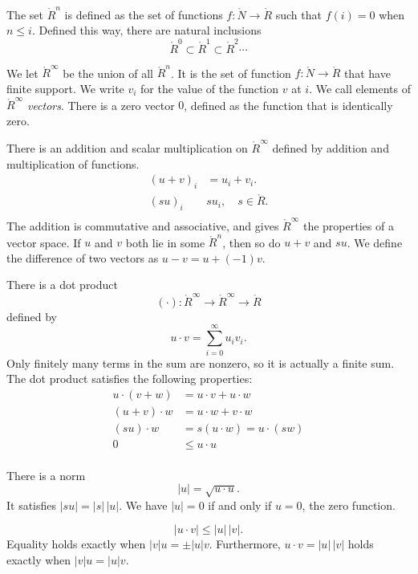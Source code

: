 The set $\ring{R}^n$ is defined as the set of functions
$f:\ring{N}\to\ring{R}$ such that $f(i) = 0$ when $n\le i$. Defined
this way, there are natural inclusions
    $$\ring{R}^0 \subset \ring{R}^1 \subset \ring{R}^2 \cdots$$

We let $\ring{R}^\infty$ be the union of all $\ring{R}^n$.  It is
the set of function $f:\ring{N}\to\ring{R}$ that have finite
support.  We write $v_i$ for the value of the function $v$ at $i$.
We call elements of $\ring{R}^\infty$ {\it vectors}.  There is a
zero vector $0$, defined as the function that is identically zero.

There is an addition and scalar multiplication on $\ring{R}^\infty$
defined by addition and multiplication of functions.
    $$\begin{array}{lll}
    (u + v)_i &= u_i + v_i.\\
    (s u)_i & s u_i,\quad s\in\ring{R}.\\
    \end{array}
    $$
The addition is commutative and associative, and gives
$\ring{R}^\infty$ the properties of a vector space. If $u$ and
$v$ both lie in some $\ring{R}^n$, then so do $u+v$ and $s u$.
We define the difference of two vectors as $u - v = u + (-1) v$.


There is a dot product
$$(\cdot):\ring{R}^\infty\to\ring{R}^\infty\to\ring{R}$$ defined by
    $$u\cdot v = \sum_{i=0}^\infty u_i v_i.$$
Only finitely many terms in the sum are nonzero, so it is actually a
finite sum.  The dot product satisfies the following
properties:
    $$\begin{array}{lll}
        u \cdot (v + w) &= u \cdot v + u \cdot w\\
        (u + v)\cdot w &= u \cdot w + v \cdot w\\
        (s u)\cdot w &= s(u \cdot w) = u \cdot (s w)\\
        0 &\le u\cdot u\\
    \end{array}$$


There is a norm
$$|u| = \sqrt{u\cdot u}.$$
It satisfies $| s u | = |s| \, |u|$.  We have $|u|=0$  if and
only if $u=0$, the zero function.

\begin{lemma}
    $$|u \cdot v| \le |u|\,|v|.$$
Equality holds exactly when $|v|u = \pm |u|v$.  Furthermore,
$u\cdot v = |u|\,|v|$ holds exactly when $|v| u = |u| v$.
\end{lemma}

